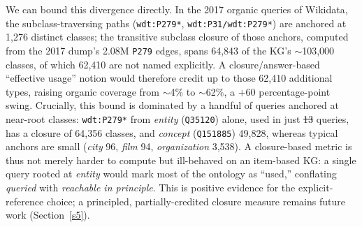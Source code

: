 \documentclass[sw]{iosart2x}
\providecommand{\DIFadd}[1]{{\protect\color{blue}\uwave{#1}}} %
\providecommand{\DIFdel}[1]{{\protect\color{red}\sout{#1}}} %
\providecommand{\DIFaddbegin}{} %
\providecommand{\DIFaddend}{} %
\providecommand{\DIFdelbegin}{} %
\providecommand{\DIFdelend}{} %
\providecommand{\DIFscaledelfig}{0.5}
\newlength{\DIFdelgraphicswidth} %
\newlength{\DIFdelgraphicsheight} %
\providecommand{\DIFaddincludegraphics}[2][]{{\color{blue}\fbox{\DIFOincludegraphics[#1]{#2}}}} %
\providecommand{\DIFdelincludegraphics}[2][]{%
\sbox{\DIFdelgraphicsbox}{\DIFOincludegraphics[#1]{#2}}%
\settoboxwidth{\DIFdelgraphicswidth}{\DIFdelgraphicsbox} %
\settoboxtotalheight{\DIFdelgraphicsheight}{\DIFdelgraphicsbox} %
\scalebox{\DIFscaledelfig}{%
\parbox[b]{\DIFdelgraphicswidth}{\usebox{\DIFdelgraphicsbox}\\[-\baselineskip] \rule{\DIFdelgraphicswidth}{0em}}\llap{\resizebox{\DIFdelgraphicswidth}{\DIFdelgraphicsheight}{%
\setlength{\unitlength}{\DIFdelgraphicswidth}%
\begin{picture}(1,1)%
\thicklines\linethickness{2pt} %
{\color[rgb]{1,0,0}\put(0,0){\framebox(1,1){}}}%
{\color[rgb]{1,0,0}\put(0,0){\line( 1,1){1}}}%
{\color[rgb]{1,0,0}\put(0,1){\line(1,-1){1}}}%
\end{picture}%
}\hspace*{3pt}}} %
} %
\DeclareRobustCommand{\DIFaddbegin}{\DIFOaddbegin \let\includegraphics\DIFaddincludegraphics} %
\DeclareRobustCommand{\DIFaddend}{\DIFOaddend \let\includegraphics\DIFOincludegraphics} %
\DeclareRobustCommand{\DIFdelbegin}{\DIFOdelbegin \let\includegraphics\DIFdelincludegraphics} %
\DeclareRobustCommand{\DIFdelend}{\DIFOaddend \let\includegraphics\DIFOincludegraphics} %
\begin{document}
We can bound this divergence directly. In the 2017 organic queries of Wikidata, the subclass-traversing paths (\texttt{wdt:P279*}, \texttt{wdt:P31/wdt:P279*}) are anchored at 1,276 distinct classes; the transitive subclass closure of those anchors, computed from the 2017 dump's 2.08M \texttt{P279} edges, spans 64,843 of the KG's $\sim$103,000 classes, of which 62,410 are not named explicitly. A closure/answer-based ``effective usage'' notion would therefore credit up to those 62,410 additional types, raising organic coverage from $\sim$4\% to $\sim$62\%, a $+60$ percentage-point swing. Crucially, this bound is dominated by a handful of queries anchored at near-root classes: \texttt{wdt:P279*} from \emph{entity} (\texttt{Q35120}) alone, used in just \DIFdelbegin \DIFdel{13 }\DIFdelend \DIFaddbegin \DIFadd{12 }\DIFaddend queries, has a closure of 64,356 classes, and \emph{concept} (\texttt{Q151885}) 49,828, whereas typical anchors are small (\emph{city} 96, \emph{film} 94, \emph{organization} 3,538). A closure-based metric is thus not merely harder to compute but ill-behaved on an item-based KG: a single query rooted at \emph{entity} would mark most of the ontology as ``used,'' conflating \emph{queried} with \emph{reachable in principle}. This is positive evidence for the explicit-reference choice; a principled, partially-credited closure measure remains future work (Section~\ref{s5}).
\DIFdelbegin %
\DIFdelend 
\end{document}
